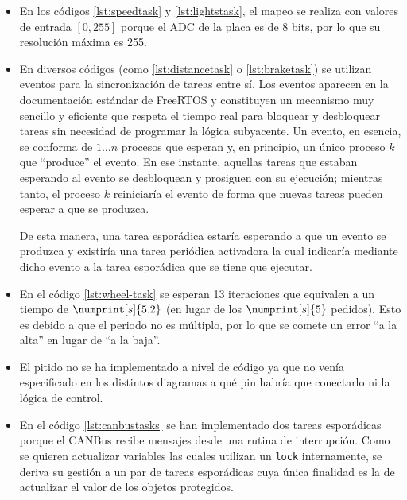 \begin{itemize}
  \item En los códigos \ref{lst:speedtask} y \ref{lst:lightstask}, el mapeo se realiza con valores
        de entrada $\left[0, 255\right]$ porque el ADC de la placa
        es de 8 bits, por lo que su resolución máxima es 255.
  \item En diversos códigos (como \ref{lst:distancetask} o \ref{lst:braketask}) se
        utilizan eventos para la sincronización de tareas entre sí. Los eventos
        aparecen en la documentación estándar de FreeRTOS y constituyen un mecanismo
        muy sencillo y eficiente que respeta el tiempo real para bloquear y desbloquear
        tareas sin necesidad de programar la lógica subyacente. Un evento, en esencia,
        se conforma de $1 \dots n$ procesos que esperan y, en principio, un único proceso
        $k$ que ``produce'' el evento. En ese instante, aquellas tareas que estaban
        esperando al evento se desbloquean y prosiguen con su ejecución; mientras tanto,
        el proceso $k$ reiniciaría el evento de forma que nuevas tareas pueden esperar
        a que se produzca.

        De esta manera, una tarea esporádica estaría esperando a que un evento se
        produzca y existiría una tarea periódica activadora la cual indicaría
        mediante dicho evento a la tarea esporádica que se tiene que ejecutar.
  \item En el código \ref{lst:wheel-task} se esperan 13 iteraciones que equivalen a un
        tiempo de $\numprint[s]{5.2}$ (en lugar de los $\numprint[s]{5}$ pedidos). Esto
        es debido a que el periodo no es múltiplo, por lo que se comete un error
        ``a la alta'' en lugar de ``a la baja''.
  \item El pitido no se ha implementado a nivel de código ya que no venía especificado
        en los distintos diagramas a qué pin habría que conectarlo ni la lógica de
        control.
  \item En el código \ref{lst:canbustasks} se han implementado dos tareas esporádicas
        porque el CANBus recibe mensajes desde una rutina de interrupción. Como se quieren
        actualizar variables las cuales utilizan un \texttt{lock} internamente, se
        deriva su gestión a un par de tareas esporádicas cuya única finalidad es la
        de actualizar el valor de los objetos protegidos.
\end{itemize}